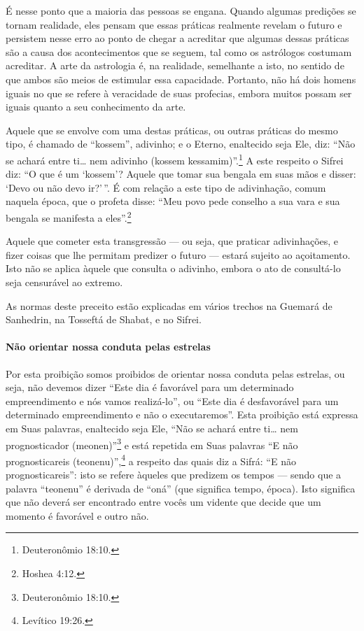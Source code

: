 É nesse ponto que a maioria das pessoas se engana. Quando algumas
predições se tornam realidade, eles pensam que essas práticas realmente
revelam o futuro e persistem nesse erro ao ponto de chegar a acreditar
que algumas dessas práticas são a causa dos acontecimentos que se
seguem, tal como os astrólogos costumam acreditar. A arte da astrologia
é, na realidade, semelhante a isto, no sentido de que ambos são meios de
estimular essa capacidade. Portanto, não há dois homens iguais no que se refere à veracidade de suas
profecias, embora muitos possam ser iguais quanto a seu conhecimento da
arte.

Aquele que se envolve com uma destas práticas, ou outras práticas do
mesmo tipo, é chamado de ``kossem'', adivinho; e o Eterno, enaltecido
seja Ele, diz: ``Não se achará entre ti\ldots{} nem adivinho (kossem
kessamim)''.\footnote{Deuteronômio 18:10.} A este respeito o Sifrei diz: ``O que
é um `kossem'? Aquele que tomar sua bengala em suas mãos e disser: `Devo
ou não devo ir?'\,''. É com relação a este tipo de adivinhação, comum
naquela época, que o profeta disse: ``Meu povo pede conselho a sua vara
e sua bengala se manifesta a eles''.\footnote{Hoshea 4:12.}

Aquele que cometer esta transgressão --- ou seja, que praticar
adivinhações, e fizer coisas que lhe permitam predizer o futuro ---
estará sujeito ao açoitamento. Isto não se aplica àquele que consulta o
adivinho, embora o ato de consultá-lo seja censurável ao extremo.

As normas deste preceito estão explicadas em vários trechos na Guemará
de Sanhedrin, na Tosseftá de Shabat, e no Sifrei.

\paragraph{Não orientar nossa conduta pelas estrelas}

Por esta proibição somos proibidos de orientar nossa conduta pelas
estrelas, ou seja, não devemos dizer ``Este dia é favorável para um
determinado empreendimento e nós vamos realizá-lo'', ou ``Este dia é
desfavorável para um determinado empreendimento e não o executaremos''.
Esta proibição está expressa em Suas palavras, enaltecido seja Ele,
``Não se achará entre ti\ldots{} nem prognosticador (meonen)''\footnote{Deuteronômio
18:10.} e está repetida em Suas palavras ``E não prognosticareis
(teonenu)'',\footnote{Levítico 19:26.} a respeito das quais diz a Sifrá: ``E não
prognosticareis'': isto se refere àqueles que predizem os tempos ---
sendo que a palavra ``teonenu'' é derivada de ``oná'' (que significa
tempo, época). Isto significa que não deverá ser encontrado entre vocês
um vidente que decide que um momento é favorável e outro não.

